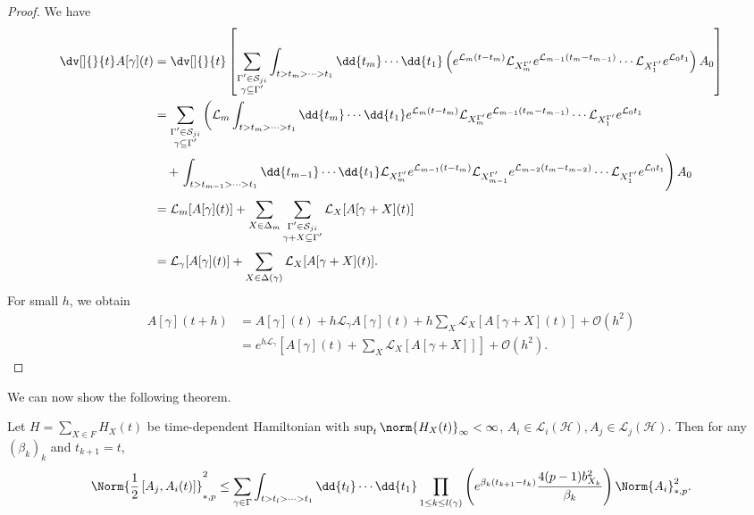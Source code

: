 \begin{proof}
    We have 
    \begin{align*}
      \dv[]{}{t}A[\gamma](t) &= \dv[]{}{t} \left[\sum_{\substack{\Gamma' \in \mathcal{S}_{ji} \\ \gamma \subseteq  \Gamma'}}^{} \int_{t > t_m > \dots > t_1}^{}  \dd{t_m} \cdots \dd{t_1}\left(e^{\mathcal{L}_m(t-t_m)} \mathcal{L}_{X_m^{\Gamma '}}e^{\mathcal{L}_{m-1}(t_m-t_{m-1})} \cdots \mathcal{L}_{X_1^{\Gamma '}} e^{\mathcal{L}_0t_1}\right)A_0\right] \\
                             &= \sum_{\substack{\Gamma' \in \mathcal{S}_{ji} \\ \gamma \subseteq  \Gamma'}}^{} \left(\mathcal{L}_m \int_{t> t_m > \dots > t_1}^{}  \dd{t_m} \cdots \dd{t_1} e^{\mathcal{L}_m(t-t_m)} \mathcal{L}_{X_m^{\Gamma '}}e^{\mathcal{L}_{m-1}(t_m-t_{m-1})} \cdots \mathcal{L}_{X_1^{\Gamma '}} e^{\mathcal{L}_0t_1}\right. \\
                             & \quad + \left. \int_{t> t_{m-1} > \dots > t_1}^{}  \dd{t_{m-1}} \cdots \dd{t_1} \mathcal{L}_{X_m^{\Gamma '}}e^{\mathcal{L}_{m-1}(t-t_m)} \mathcal{L}_{X_{m-1}^{\Gamma '}}e^{\mathcal{L}_{m-2}(t_m-t_{m-2})} \cdots \mathcal{L}_{X_1^{\Gamma '}} e^{\mathcal{L}_0t_1} \right) A_0 \\ 
                             &= \mathcal{L}_{m}[A[\gamma](t)] + \sum_{X \in \Delta_m}^{} \sum_{\substack{\Gamma' \in \mathcal{S}_{ji} \\ \gamma + X \subseteq \Gamma' }}^{} \mathcal{L}_X[A[\gamma+ X](t)] \\
                             &= \mathcal{L}_{\gamma} [A[\gamma](t)] + \sum_{X \in \Delta(\gamma)}^{} \mathcal{L}_X[A[\gamma + X](t)].
    \end{align*}
    For small \( h \), we obtain 
    \begin{align*}
      A[\gamma](t+h) &= A[\gamma](t) + h \mathcal{L}_{\gamma }A[\gamma](t) + h \sum_{X}^{}\mathcal{L}_X\left[A [\gamma + X](t)\right] + \mathcal{O}(h^{2}) \\
      & = e^{h \mathcal{L}_\gamma} \left[A[\gamma](t) + \sum_{X}^{} \mathcal{L}_X \left[A[\gamma+X]\right]\right] + \mathcal{O}(h^{2}).
    \end{align*}
    
\end{proof}


We can now show the following theorem.


\begin{thm}
  \label{growthtimedep}
  Let \(H=\sum_{X\in F}^{} H_X(t)\) be time-dependent Hamiltonian with \(\sup_{t}\norm{H_X(t)}_{\infty}< \infty\), \(A_i \in \mathcal{L}_{i}(\mathcal{H}), A_{j}\in \mathcal{L}_j(\mathcal{H})\).
  Then for any \( (\beta_k)_k \) and \( t_{k+1}=t \),
  \[ \Norm{ \frac{1}{2} \left[A_j,A_i(t)\right]}_{*,p}^{2} \leq \sum_{\gamma \in \Gamma }^{} \int_{t>t_l > \dots > t_1}^{}  \dd{t_l} \cdots \dd{t_1} \prod_{1 \leq k \leq l(\gamma )}^{} \left(e^{\beta_k (t_{k+1}-t_k)} \frac{4(p-1) b_{X_k}^{2}}{\beta_k}\right) \Norm{A_i}_{*,p}^{2}. \]  

\end{thm}

